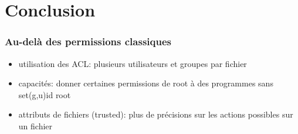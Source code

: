 \begin{reveals}
\begin{frame}
  \vfill
\end{frame}

\section{Conclusion}

\begin{frame}
  \frametitle{Au-delà des permissions classiques}

  \vfill

  \begin{itemize}
  \item utilisation des ACL: plusieurs utilisateurs et groupes par
    fichier
  \item capacités: donner certaines permissions de root à des
    programmes sans set(g,u)id root
  \item attributs de fichiers (trusted): plus de précisions sur les actions
    possibles sur un fichier
  \end{itemize}

  \vfill
\end{frame}

\end{reveals}

 
